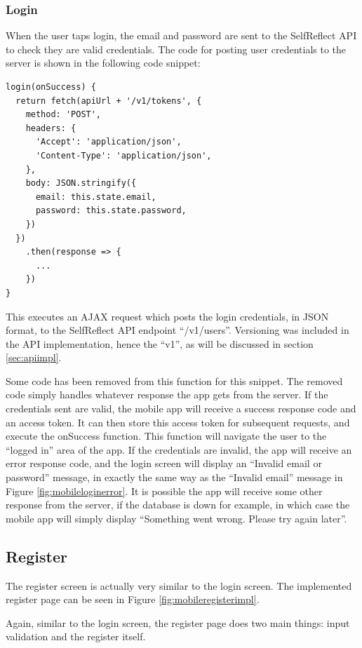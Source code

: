 \documentclass[11pt,openright,a4paper]{report}
\begin{document}
\subsubsection{Login}
When the user taps login, the email and password are sent to the SelfReflect API to check they are valid credentials. The code for posting user credentials to the server is shown in the following code snippet:
\begin{lstlisting}
login(onSuccess) {
  return fetch(apiUrl + '/v1/tokens', {
    method: 'POST',
    headers: {
      'Accept': 'application/json',
      'Content-Type': 'application/json',
    },
    body: JSON.stringify({
      email: this.state.email,
      password: this.state.password,
    })
  })
    .then(response => {
      ...
    })
}
\end{lstlisting}

This executes an AJAX request which posts the login credentials, in JSON format, to the SelfReflect API endpoint \enquote{/v1/users}. Versioning was included in the API implementation, hence the \enquote{v1}, as will be discussed in section \ref{sec:apiimpl}.

Some code has been removed from this function for this snippet. The removed code simply handles whatever response the app gets from the server. If the credentials sent are valid, the mobile app will receive a success response code and an access token. It can then store this access token for subsequent requests, and execute the onSuccess function. This function will navigate the user to the \enquote{logged in} area of the app. If the credentials are invalid, the app will receive an error response code, and the login screen will display an \enquote{Invalid email or password} message, in exactly the same way as the \enquote{Invalid email} message in Figure \ref{fig:mobileloginerror}. It is possible the app will receive some other response from the server, if the database is down for example, in which case the mobile app will simply display \enquote{Something went wrong. Please try again later}.

\subsection{Register}
The register screen is actually very similar to the login screen. The implemented register page can be seen in Figure \ref{fig:mobileregisterimpl}.

Again, similar to the login screen, the register page does two main things: input validation and the register itself.
\end{document}
